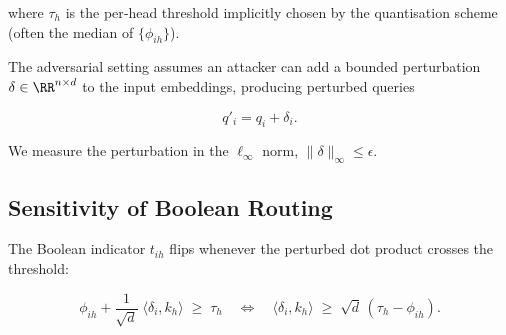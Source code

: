 where $\tau_h$ is the per‑head threshold implicitly chosen by the quantisation scheme (often the median of $\{\phi_{ih}\}$).













The adversarial setting assumes an attacker can add a bounded perturbation $\delta\in\RR^{n\times d}$ to the input embeddings, producing perturbed queries






\[






q'_{i}=q_{i}+\delta_{i}.






\]






We measure the perturbation in the $\ell_\infty$ norm, $\|\delta\|_\infty\le\epsilon$.













\subsection{Sensitivity of Boolean Routing}













The Boolean indicator $t_{ih}$ flips whenever the perturbed dot product crosses the threshold:






\[






\phi_{ih} + \frac{1}{\sqrt{d}}\;\langle \delta_{i},k_{h}\rangle






    \;\ge\;\tau_h






    \quad\Longleftrightarrow\quad






    \langle \delta_{i},k_{h}\rangle \;\ge\;






    \sqrt{d}\,(\tau_h-\phi_{ih}).






\]






